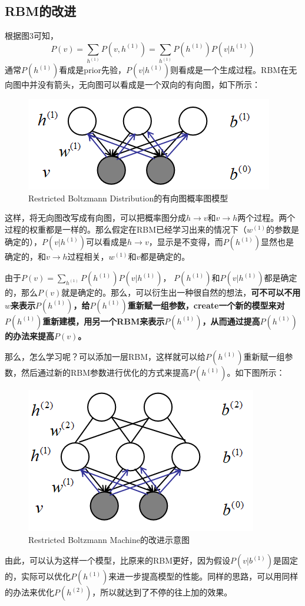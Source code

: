 \documentclass[a4paper]{article}
\begin{document}
\subsection{RBM的改进}
根据图3可知，
\begin{equation}
    P(v) = \sum_{h^{(1)}} P(v, h^{(1)}) = \sum_{h^{(1)}} P(h^{(1)})P(v| h^{(1)})
\end{equation}
通常$P(h^{(1)})$看成是prior先验，$P(v| h^{(1)})$则看成是一个生成过程。RBM在无向图中并没有箭头，无向图可以看成是一个双向的有向图，如下所示：
\begin{figure}[H]
    \centering
    \includegraphics[width=.4\textwidth]{微信图片_20200407163930.png}
    \caption{Restricted Boltzmann Distribution的有向图概率图模型}
    \label{fig:my_label_1}
\end{figure}
这样，将无向图改写成有向图，可以把概率图分成$h\longrightarrow v$和$v\longrightarrow h$两个过程。两个过程的权重都是一样的。那么假定在RBM已经学习出来的情况下（$w^{(1)}$的参数是确定的），$P(v|h^{(1)})$可以看成是$h\longrightarrow v$，显示是不变得，而$P(h^{(1)})$显然也是确定的，和$v\longrightarrow h$过程相关，$w^{(1)}$和$v$都是确定的。

由于$P(v) = \sum_{h^{(1)}} P(h^{(1)})P(v| h^{(1)})$， $P(h^{(1)})$和$P(v| h^{(1)})$都是确定的，那么$P(v)$就是确定的。那么，可以衍生出一种很自然的想法，\textbf{可不可以不用$w$来表示$P(h^{(1)})$，给$P(h^{(1)})$重新赋一组参数，create一个新的模型来对$P(h^{(1)})$重新建模，用另一个RBM来表示$P(h^{(1)})$，从而通过提高$P(h^{(1)})$的办法来提高$P(v)$。}

那么，怎么学习呢？可以添加一层RBM，这样就可以给$P(h^{(1)})$重新赋一组参数，然后通过新的RBM参数进行优化的方式来提高$P(h^{(1)})$。如下图所示：
\begin{figure}[H]
    \centering
    \includegraphics[width=.4\textwidth]{微信图片_20200407170000.png}
    \caption{Restricted Boltzmann Machine的改进示意图}
    \label{fig:my_label_1}
\end{figure}
由此，可以认为这样一个模型，比原来的RBM更好，因为假设$P(v|b^{(1)})$是固定的，实际可以优化$P(h^{(1)})$来进一步提高模型的性能。同样的思路，可以用同样的办法来优化$P(h^{(2)})$，所以就达到了不停的往上加的效果。
\end{document}
